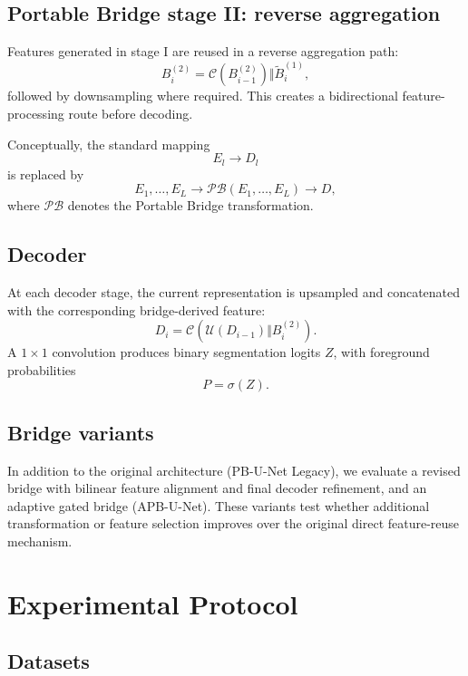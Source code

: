\documentclass[11pt]{article}
\begin{document}
\subsection{Portable Bridge stage II: reverse aggregation}
Features generated in stage I are reused in a reverse aggregation path:
\begin{equation}
B_i^{(2)}=\mathcal{C}(B_{i-1}^{(2)})\Vert \widetilde{B}_i^{(1)},
\end{equation}
followed by downsampling where required. This creates a bidirectional feature-processing route before decoding.

Conceptually, the standard mapping
\begin{equation}
E_l \rightarrow D_l
\end{equation}
is replaced by
\begin{equation}
E_1,\ldots,E_L \rightarrow \mathcal{PB}(E_1,\ldots,E_L) \rightarrow D,
\end{equation}
where $\mathcal{PB}$ denotes the Portable Bridge transformation.

\subsection{Decoder}
At each decoder stage, the current representation is upsampled and concatenated with the corresponding bridge-derived feature:
\begin{equation}
D_i=\mathcal{C}\left(\mathcal{U}(D_{i-1})\Vert B_i^{(2)}\right).
\end{equation}
A $1\times1$ convolution produces binary segmentation logits $Z$, with foreground probabilities
\begin{equation}
P=\sigma(Z).
\end{equation}

\subsection{Bridge variants}
In addition to the original architecture (PB-U-Net Legacy), we evaluate a revised bridge with bilinear feature alignment and final decoder refinement, and an adaptive gated bridge (APB-U-Net). These variants test whether additional transformation or feature selection improves over the original direct feature-reuse mechanism.

\section{Experimental Protocol}
\subsection{Datasets}
\end{document}
